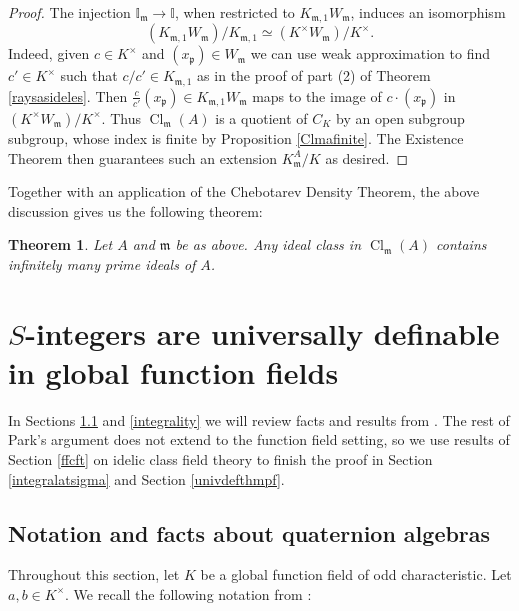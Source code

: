 \documentclass[12pt,reqno]{amsart}
\newcommand{\mm}{\mathfrak{m}}
\newcommand{\pp}{\mathfrak{p}}
\newcommand{\II}{\mathbb{I}}
\DeclareMathOperator{\Cl}{Cl}
\newtheorem{thm}{Theorem}[section]
\theoremstyle{definition}
\begin{document}
\begin{proof}
The injection $\II_{\mm}\to \II$, when restricted to $K_{\mm,1}W_{\mm}$, induces an isomorphism 
\[
(K_{\mm,1}W_{\mm})/K_{\mm,1}\simeq (K^{\times}W_{\mm})/K^{\times}.
\]
Indeed, given $c\in K^{\times}$ and $(x_{\pp})\in W_{\mm}$ we can use weak approximation to find $c'\in K^{\times}$ such that $c/c'\in K_{\mm,1}$ as in the proof of part (2) of Theorem \ref{raysasideles}. Then $\frac{c}{c'}(x_{\pp})\in K_{\mm,1}W_{\mm}$ maps to the image of $c\cdot(x_{\pp})$ in $(K^{\times}W_{\mm})/K^{\times}$. Thus $\Cl_{\mm}(A)$ is a quotient of $C_K$ by an open subgroup
  subgroup, whose index is finite by Proposition \ref{Clmafinite}. The Existence Theorem then guarantees such an extension $K_{\mm}^A/K$ as desired.
\end{proof}


 Together with an application of the Chebotarev Density Theorem, the above
  discussion gives us the following theorem:
  
\begin{thm}\label{chebA}
Let $A$ and $\mm$ be as above. Any ideal class in $\Cl_{\mm}(A)$ contains infinitely
  many prime ideals of $A$.
\end{thm}




\section{$S$-integers are universally definable in global function fields}\label{univdef}

In Sections \ref{QAfacts} and \ref{integrality} we will review facts and results from \cite{Park}. The rest of Park's argument does not extend to the function field setting, so we use results of Section \ref{ffcft} on idelic class field theory to finish the proof in Section \ref{integralatsigma} and Section \ref{univdefthmpf}.

\subsection{Notation and facts about quaternion algebras}\label{QAfacts}

 Throughout this section, let $K$ be a global function field
of odd characteristic. Let $a,b\in K^{\times}$. We recall the following notation from \cite{Park}:
\end{document}
